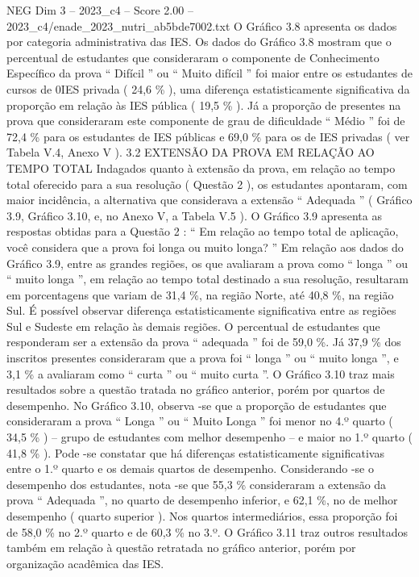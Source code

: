 \begin{textsample}{NEG Dim 3 – 2023\_c4 – Score 2.00 – 2023\_c4/enade\_2023\_nutri\_ab5bde7002.txt}
O Gráfico 3.8 apresenta os dados por categoria administrativa das IES.
Os dados do Gráfico 3.8 mostram que o percentual de estudantes que consideraram o componente de Conhecimento Específico da prova “ Difícil ” ou “ Muito difícil ” foi maior entre os estudantes de cursos de 0IES privada ( 24,6 \% ), uma diferença estatisticamente significativa da proporção em relação às IES pública ( 19,5 \% ).
Já a proporção de presentes na prova que consideraram este componente de grau de dificuldade “ Médio ” foi de 72,4 \% para os estudantes de IES públicas e 69,0 \% para os de IES privadas ( ver Tabela V.4, Anexo V ). 3.2 EXTENSÃO DA PROVA EM RELAÇÃO AO TEMPO TOTAL Indagados quanto à extensão da prova, em relação ao tempo total oferecido para a sua resolução ( Questão 2 ), os estudantes apontaram, com maior incidência, a alternativa que considerava a extensão “ Adequada ” ( Gráfico 3.9, Gráfico 3.10, e, no Anexo V, a Tabela V.5 ).
O Gráfico 3.9 apresenta as respostas obtidas para a Questão 2 : “ Em relação ao tempo total de aplicação, você considera que a prova foi longa ou muito longa? ” Em relação aos dados do Gráfico 3.9, entre as grandes regiões, os que avaliaram a prova como “ longa ” ou “ muito longa ”, em relação ao tempo total destinado a sua resolução, resultaram em porcentagens que variam de 31,4 \%, na região Norte, até 40,8 \%, na região Sul.
É possível observar diferença estatisticamente significativa entre as regiões Sul e Sudeste em relação às demais regiões.
O percentual de estudantes que responderam ser a extensão da prova “ adequada ” foi de 59,0 \%.
Já 37,9 \% dos inscritos presentes consideraram que a prova foi “ longa ” ou “ muito longa ”, e 3,1 \% a avaliaram como “ curta ” ou “ muito curta ”.
O Gráfico 3.10 traz mais resultados sobre a questão tratada no gráfico anterior, porém por quartos de desempenho.
No Gráfico 3.10, observa -se que a proporção de estudantes que consideraram a prova “ Longa ” ou “ Muito Longa ” foi menor no 4.º quarto ( 34,5 \% ) – grupo de estudantes com melhor desempenho – e maior no 1.º quarto ( 41,8 \% ).
Pode -se constatar que há diferenças estatisticamente significativas entre o 1.º quarto e os demais quartos de desempenho.
Considerando -se o desempenho dos estudantes, nota -se que 55,3 \% consideraram a extensão da prova “ Adequada ”, no quarto de desempenho inferior, e 62,1 \%, no de melhor desempenho ( quarto superior ).
Nos quartos intermediários, essa proporção foi de 58,0 \% no 2.º quarto e de 60,3 \% no 3.º.
O Gráfico 3.11 traz outros resultados também em relação à questão retratada no gráfico anterior, porém por organização acadêmica das IES.

\end{textsample}
